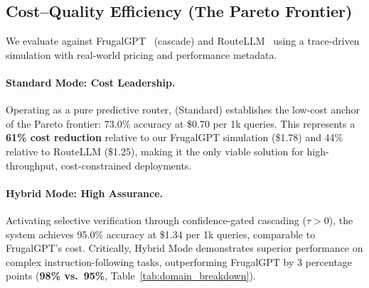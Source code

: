 \subsection{Cost--Quality Efficiency (The Pareto Frontier)}
\label{sec:rq3}

We evaluate \ours{} against FrugalGPT~\cite{chen2023frugalgpt} (cascade) and RouteLLM~\cite{ong2024routellm} using a trace-driven simulation with real-world pricing and performance metadata.

\begin{table}[t]
\centering
\small
\caption{\textbf{SOTA Comparison.} Standard mode is the cost leader; Hybrid mode approaches cascading accuracy while operating over an 80+ model pool without fixed chains.}
\label{tab:sota_comparison}
\end{table}

\paragraph{Standard Mode: Cost Leadership.} Operating as a pure predictive router, \ours{} (Standard) establishes the low-cost anchor of the Pareto frontier: 73.0\% accuracy at \$0.70 per 1k queries. This represents a \textbf{61\% cost reduction} relative to our FrugalGPT simulation (\$1.78) and 44\% relative to RouteLLM (\$1.25), making it the only viable solution for high-throughput, cost-constrained deployments.

\paragraph{Hybrid Mode: High Assurance.} Activating selective verification through confidence-gated cascading ($\tau > 0$), the system achieves 95.0\% accuracy at \$1.34 per 1k queries, comparable to FrugalGPT's cost. Critically, Hybrid Mode demonstrates superior performance on complex instruction-following tasks, outperforming FrugalGPT by 3 percentage points (\textbf{98\% vs.\ 95\%}, Table~\ref{tab:domain_breakdown}).

